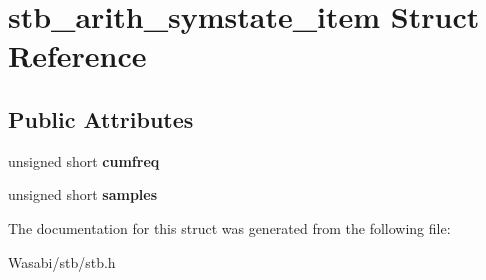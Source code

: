 \hypertarget{structstb__arith__symstate__item}{}\section{stb\+\_\+arith\+\_\+symstate\+\_\+item Struct Reference}
\label{structstb__arith__symstate__item}
\subsection*{Public Attributes}
\begin{DoxyCompactItemize}
\item 
unsigned short {\bfseries cumfreq}\hypertarget{structstb__arith__symstate__item_a7a037703bf5e2e3dcca7baad936a582b}{}\label{structstb__arith__symstate__item_a7a037703bf5e2e3dcca7baad936a582b}

\item 
unsigned short {\bfseries samples}\hypertarget{structstb__arith__symstate__item_adf49aaee14629a8f2e6343e9343796ea}{}\label{structstb__arith__symstate__item_adf49aaee14629a8f2e6343e9343796ea}

\end{DoxyCompactItemize}


The documentation for this struct was generated from the following file\+:\begin{DoxyCompactItemize}
\item 
Wasabi/stb/stb.\+h\end{DoxyCompactItemize}
